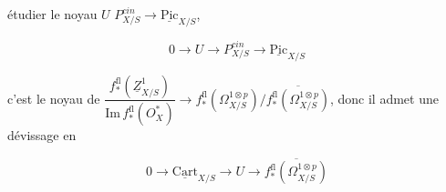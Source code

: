 étudier le noyau $U$   $P^{cin}_{X/S}\to\underline{\mathrm{Pic}}_{X/S}$,

\[
0\longrightarrow U\longrightarrow P^{cin}_{X/S}\longrightarrow\underline{\mathrm{Pic}}_{X/S}\tag*{(4.4)}
\]

c'est le noyau de $\dfrac{f_*^{\mathrm{fl}}(\underline Z^1_{X/S})}{\mathrm{Im}\,f_*^{\mathrm{fl}}(O^*_{X})}\longrightarrow f_*^{\mathrm{fl}}(\Omega^{1\otimes p}_{X/S})/\overline{f_*^{\mathrm{fl}}(\Omega^{1\otimes p}_{X/S})}$, donc il admet une dévissage en

\[
0\longrightarrow\underline{\mathrm{Cart}}_{X/S}\longrightarrow U\longrightarrow\overline{f_*^{\mathrm{fl}}(\Omega^{1\otimes p}_{X/S})}\tag*{(4.5)}
\]

